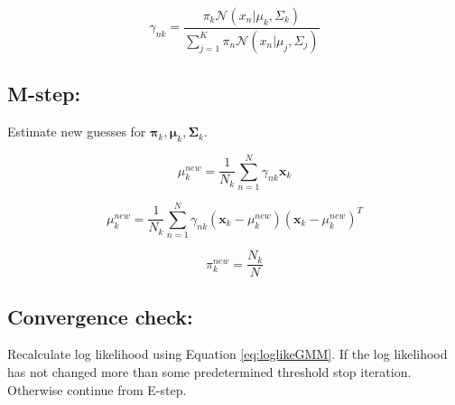 \begin{equation}
\gamma_{nk} = 
\frac
{\pi_{k}\mathcal{N}(x_{n}|\mu_{k},\Sigma_{k})}
{\sum_{j=1}^{K} \pi_{n}\mathcal{N}(x_{n}|\mu_{j},\Sigma_{j})}
\end{equation}

\subsection*{M-step:}
Estimate new guesses for $ \mathbf{\pi}_{k}, \mathbf{\mu}_{k}, \mathbf{\Sigma}_{k} $.

\begin{equation}
\mu_{k}^{new} = 
\frac{1}{N_{k}}
\sum_{n=1}^{N} 
\gamma_{nk}
\mathbf{x}_{k}
\end{equation}

\begin{equation}
\mu_{k}^{new} = 
\frac{1}{N_{k}}
\sum_{n=1}^{N} 
\gamma_{nk}
(\mathbf{x}_{k} - \mu_{k}^{new})
(\mathbf{x}_{k} - \mu_{k}^{new})^{T}
\end{equation}

\begin{equation}
\pi_{k}^{new} =
\frac
{N_{k}}
{N}
\end{equation}

\subsection*{Convergence check:}

Recalculate log likelihood using Equation \ref{eq:loglikeGMM}.
If the log likelihood has not changed more than some predetermined threshold stop iteration.
Otherwise continue from E-step.

